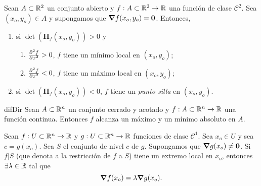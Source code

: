 \begin{theorem} \label{teo:derivada_2da}
\mbox{}

 Sean $A \subset \mathbb{R}^2$ un conjunto abierto y $f: A \subset \mathbb{R}^2 \to \mathbb{R}$ una funci\'on de clase $\mathcal{C}^2$. Sea $(x_o,y_o) \in A$ y supongamos que $\grad f(x_o,y_o) = \mathbf{0}$. Entonces,  
 \begin{enumerate} %
    \item si $\det(\mathbf{H}_f (x_o,y_o)) > 0$ y
    \begin{enumerate} %
        \item $\pdv[2]{f}{x} (x_o,y_o) > 0$, $f$ tiene un m\'inimo local en $(x_o,y_o)$;
        \item $\pdv[2]{f}{x} (x_o,y_o) < 0$, $f$ tiene un m\'aximo local en $(x_o,y_o)$;
    \end{enumerate}
    \item si $\det(\mathbf{H}_f (x_o,y_o)) < 0$, $f$ tiene un \emph{punto silla} en $(x_o,y_o)$.
 \end{enumerate}

\end{theorem}

\begin{theorem} \label{teo:weier}difDir
  Sean $A \subset \mathbb{R}^n$ un conjunto cerrado y acotado y $f: A \subset \mathbb{R}^n \to \mathbb{R}$ una funci\'on continua. Entonces $f$ alcanza un m\'aximo y un m\'inimo absoluto en $A$.
\end{theorem}

\begin{theorem}  \label{teo:lagrange}
    Sean $f:U \subset \mathbb{R}^n \to \mathbb{R}$ y $g:U \subset \mathbb{R}^n \to \mathbb{R}$ funciones de clase $\mathcal{C}^1$. Sea $x_o \in U$ y sea $c = g(x_o)$. Sea $S$ el conjunto de nivel $c$ de $g$. Supongamos que $\grad g (x_o) \ne \mathbf{0}$. Si $f|S$ (que denota a la restricci\'on de $f$ a $S$) tiene un extremo local en $x_o$, entonces $\exists \lambda \in \mathbb{R}$ tal que
    \[
     \grad f (x_o) = \lambda \grad g (x_o).
    \]
\end{theorem}
